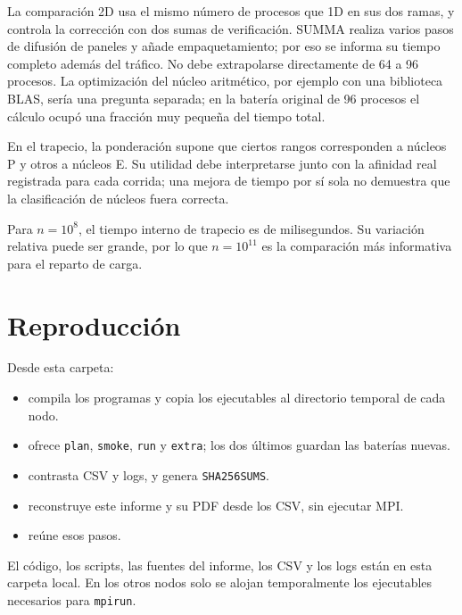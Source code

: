 \documentclass[11pt,a4paper]{article}
\begin{document}
La comparación 2D usa el mismo número de procesos que 1D en sus dos ramas, y controla la corrección con dos sumas de verificación. SUMMA realiza varios pasos de difusión de paneles y añade empaquetamiento; por eso se informa su tiempo completo además del tráfico. No debe extrapolarse directamente de 64 a 96 procesos. La optimización del núcleo aritmético, por ejemplo con una biblioteca BLAS, sería una pregunta separada; en la batería original de 96 procesos el cálculo ocupó una fracción muy pequeña del tiempo total.

En el trapecio, la ponderación supone que ciertos rangos corresponden a núcleos P y otros a núcleos E. Su utilidad debe interpretarse junto con la afinidad real registrada para cada corrida; una mejora de tiempo por sí sola no demuestra que la clasificación de núcleos fuera correcta.

Para $n=10^8$, el tiempo interno de trapecio es de milisegundos. Su variación relativa puede ser grande, por lo que $n=10^{11}$ es la comparación más informativa para el reparto de carga.

\section{Reproducción}
Desde esta carpeta:
\begin{itemize}
\item {} compila los programas y copia los ejecutables al directorio temporal de cada nodo.
\item {} ofrece \texttt{plan}, \texttt{smoke}, \texttt{run} y \texttt{extra}; los dos últimos guardan las baterías nuevas.
\item {} contrasta CSV y logs, y genera \texttt{SHA256SUMS}.
\item {} reconstruye este informe y su PDF desde los CSV, sin ejecutar MPI.
\item {} reúne esos pasos.
\end{itemize}

El código, los scripts, las fuentes del informe, los CSV y los logs están en esta carpeta local. En los otros nodos solo se alojan temporalmente los ejecutables necesarios para \texttt{mpirun}.
\end{document}
